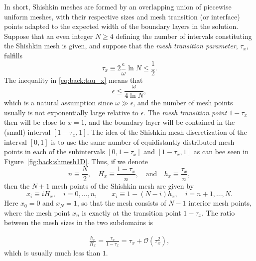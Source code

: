 In short, Shishkin meshes are formed by an overlapping union of piecewise
uniform meshes, with their respective sizes and mesh transition (or interface)
points adapted to the expected width of the boundary layers in the solution.
Suppose that an even integer $N\geq 4$ defining the number of intervals
constituting the Shishkin mesh is given, and suppose that the
\emph{mesh transition parameter}, $\tau_x$, fulfills
%
\begin{equation}\label{eq:back:tau_x}
\tau_x \equiv 2\frac{\epsilon}{\omega} \ln N \leq \frac{1}{2}.
\end{equation}
%
The inequality in \eqref{eq:back:tau_x} means that
%
\begin{equation}\label{eq:back:epsi}
\epsilon \leq \frac{\omega}{4 \ln N},
\end{equation}
%
which is a natural assumption since $\omega\gg \epsilon$, and the number of
mesh points usually is not exponentially large relative to $\epsilon$.
The \emph{mesh transition point} $1-\tau_x$ then will be close to $x=1$, and
the boundary layer will be contained in the (small) interval $[1-\tau_x, 1]$.
The idea of the Shishkin mesh discretization of the interval $[0,1]$ is to use
the same number of equidistantly distributed mesh points in each of the
subintervals $[0,1-\tau_x]$ and $[1-\tau_x,1]$ as can bee seen in
Figure~\ref{fig:back:shmesh1D}. Thus, if we denote
%
\begin{equation}\label{eq:back:nHh1D}
n\equiv \frac{N}{2},\quad H_x\equiv\frac{1-\tau_x}{n},\quad\text{and}\quad h_x\equiv \frac{\tau_x}{n},
\end{equation}
%
then the $N+1$ mesh points of the Shishkin mesh are given by
%
$$x_{i}\equiv iH_x, \quad i=0,\dots,n, \qquad x_{i}\equiv 1-(N-i)h_x, \quad i=n+1,\dots,N.$$
%
Here $x_0=0$ and $x_N=1$, so that the mesh consists of $N-1$ interior mesh
points, where the mesh point $x_n$ is exactly at the transition point
$1-\tau_x$. The ratio between the mesh sizes in the two subdomains is

\begin{align*}
\frac{h_{x}}{H_{x}} = \frac{\tau_x}{1-\tau_x} = \tau_x + \mathscr{O}(\tau_x^2),
\end{align*}
which is usually much less than $1$.

